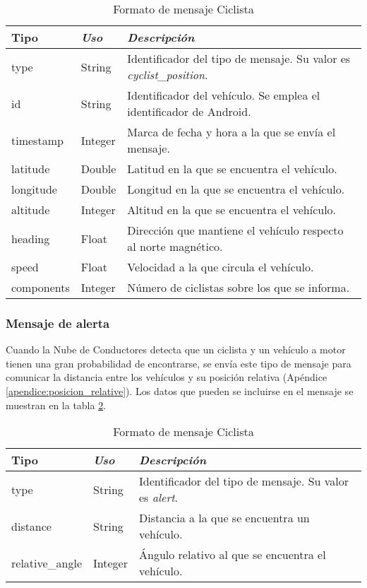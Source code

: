 \begin{table}[h]
	\centering
	\caption{Formato de mensaje Ciclista}\label{tab:CamposMensajePosCiclistaNubeConductores}
	\begin{tabular}{lll}
		\toprule
			\textbf{Tipo} & \emph{Uso} & \emph{Descripción}\\
		\midrule
			type			&	String	&	Identificador del tipo de mensaje. Su valor es
														\emph{cyclist\_position}.	\\
			id				&	String	&	Identificador del vehículo. Se emplea el
														identificador de Android.		\\
			timestamp	&	Integer	&	Marca de fecha y hora a la que se envía el mensaje.	\\
			latitude	&	Double	&	Latitud en la que se encuentra el vehículo.	\\
			longitude	&	Double	&	Longitud en la que se encuentra el vehículo.\\
			altitude	&	Integer	&	Altitud en la que se encuentra el vehículo.	\\
			heading		&	Float		&	Dirección que mantiene el vehículo respecto al
														norte magnético.\\
			speed			&	Float		&	Velocidad a la que circula el vehículo.	\\
			components 	&	Integer	&	Número de ciclistas sobre los que se informa. \\
		\bottomrule
	\end{tabular}
\end{table}
\FloatBarrier
\subsubsection{Mensaje de alerta}\label{sssection:MensajeAlerta}
Cuando la Nube de Conductores detecta que un ciclista y un vehículo a
motor tienen una gran probabilidad de encontrarse, se envía este tipo de
mensaje para comunicar la distancia entre los vehículos y su posición relativa
(Apéndice \ref{apendice:posicion_relative}). Los datos que pueden se incluirse
en el mensaje se muestran en la tabla
\ref{tab:CamposMensajeAlertaCiclistaNubeConductores}.

\begin{table}[h]
	\centering
	\caption{Formato de mensaje Ciclista}
	\label{tab:CamposMensajeAlertaCiclistaNubeConductores}
	\begin{tabular}{lll}
		\toprule
			\textbf{Tipo} & \emph{Uso} & \emph{Descripción}\\
		\midrule
			type						&	String	&	Identificador del tipo de mensaje. Su valor es
														\emph{alert}.	\\
			distance				&	String	&	Distancia a la que se encuentra un vehículo.\\
			relative\_angle	&	Integer	&	Ángulo relativo al que se encuentra
											el vehículo.\\
		\bottomrule
	\end{tabular}
\end{table}

